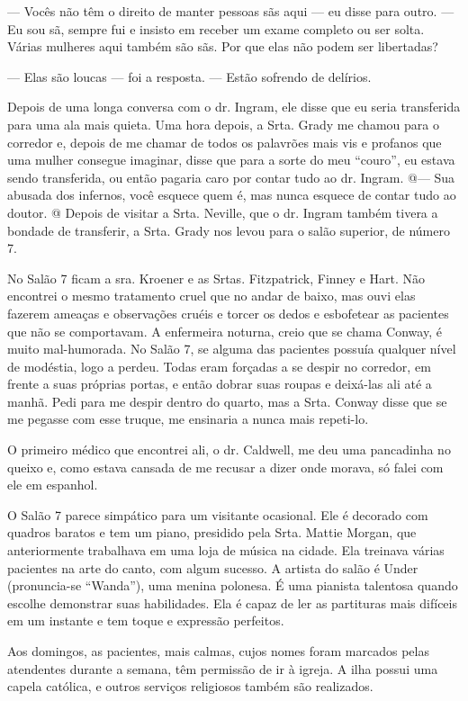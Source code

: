 --- Vocês não têm o direito de manter pessoas sãs aqui --- eu disse para
outro. --- Eu sou sã, sempre fui e insisto em receber um exame completo
ou ser solta. Várias mulheres aqui também são sãs. Por que elas não
podem ser libertadas?

--- Elas são loucas --- foi a resposta. --- Estão sofrendo de delírios.

Depois de uma longa conversa com o dr. Ingram, ele disse que eu seria
transferida para uma ala mais quieta. Uma hora depois, a Srta. Grady me
chamou para o corredor e, depois de me chamar de todos os palavrões mais
vis e profanos que uma mulher consegue imaginar, disse que para a sorte
do meu ``couro'', eu estava sendo transferida, ou então pagaria caro por
contar tudo ao dr. Ingram. @--- Sua abusada dos infernos, você esquece
quem é, mas nunca esquece de contar tudo ao doutor. @ Depois de visitar
a Srta. Neville, que o dr. Ingram também tivera a bondade de transferir,
a Srta. Grady nos levou para o salão superior, de número 7.

No
Salão 7 ficam a sra. Kroener e as Srtas. Fitzpatrick, Finney e Hart. Não
encontrei o mesmo tratamento cruel que no andar de baixo, mas ouvi elas
fazerem ameaças e observações cruéis e torcer os dedos e esbofetear as
pacientes que não se comportavam. A enfermeira noturna, creio que se
chama Conway, é muito mal-humorada. No Salão 7, se alguma das pacientes
possuía qualquer nível de modéstia, logo a perdeu. Todas eram forçadas a
se despir no corredor, em frente a suas próprias portas, e então dobrar
suas roupas e deixá-las ali até a manhã. Pedi para me despir dentro do
quarto, mas a Srta. Conway disse que se me pegasse com esse truque, me
ensinaria a nunca mais repeti-lo.

O primeiro médico que encontrei ali, o dr. Caldwell, me deu uma
pancadinha no queixo e, como estava cansada de me recusar a dizer onde
morava, só falei com ele em espanhol.

O Salão 7 parece simpático para um visitante ocasional. Ele é decorado
com quadros baratos e tem um piano, presidido pela Srta. Mattie Morgan,
que anteriormente trabalhava em uma loja de música na cidade. Ela
treinava várias pacientes na arte do canto, com algum sucesso. A artista
do salão é Under (pronuncia-se ``Wanda''), uma menina polonesa. É uma
pianista talentosa quando escolhe demonstrar suas habilidades. Ela é
capaz de ler as partituras mais difíceis em um instante e tem toque e
expressão perfeitos.

Aos domingos, as pacientes, mais calmas, cujos nomes foram marcados
pelas atendentes durante a semana, têm permissão de ir à igreja. A ilha
possui uma capela católica, e outros serviços religiosos também são
realizados.

